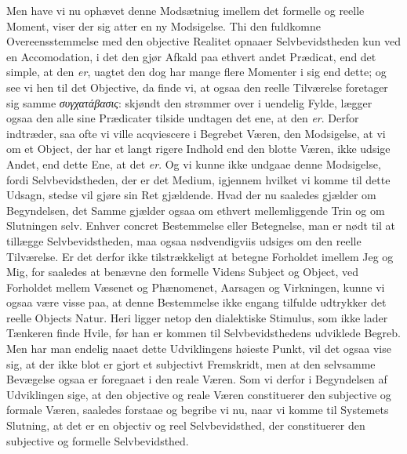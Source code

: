 \documentclass[12pt]{book}
\newcommand{\opage}[1]{\marginnote{\footnotesize\textit{[#1]}}}
\begin{document}
Men have vi nu ophævet denne Modsætniug imellem det formelle og reelle Moment,
viser der sig atter en ny Modsigelse. Thi den fuldkomne Overeensstemmelse med
den objective Realitet opnaaer Selvbevidstheden kun ved en Accomodation, i det
den gjør Afkald paa ethvert andet Prædicat, end det simple, at den \emph{er},
uagtet den dog har mange flere Momenter i sig end dette; og see vi hen til det
Objective, da finde vi, at ogsaa den reelle Tilværelse foretager sig samme
\textit{συγχατάβασις}: skjøndt den strømmer over i uendelig Fylde, lægger ogsaa
den alle sine Prædicater tilside undtagen det ene, at den \emph{er}. Derfor
indtræder, saa ofte vi ville acqviescere i Begrebet Væren, den Modsigelse, at
vi om et Object, der har et langt rigere Indhold end den blotte Væren, ikke
udsige Andet, end dette Ene, at det \emph{er}. Og vi kunne ikke undgaae denne
Modsigelse, fordi Selvbevidstheden, der er det Medium, igjennem hvilket vi
komme til dette Udsagn, stedse vil gjøre sin Ret gjældende. Hvad der nu
saaledes gjælder om Begyndelsen, det Samme gjælder ogsaa om ethvert
mellemliggende Trin og om Slutningen selv. Enhver concret Bestemmelse eller
Betegnelse, man er nødt til at tillægge Selvbevidstheden, maa ogsaa
nødvendigviis udsiges om den reelle Tilværelse. Er det derfor ikke
tilstrækkeligt at betegne Forholdet
\opage{38} imellem Jeg og Mig, for saaledes at benævne den formelle Videns Subject og
Object, ved Forholdet mellem Væsenet og Phænomenet, Aarsagen og Virkningen,
kunne vi ogsaa være visse paa, at denne Bestemmelse ikke engang tilfulde
udtrykker det reelle Objects Natur. Heri ligger netop den dialektiske Stimulus,
som ikke lader Tænkeren finde Hvile, før han er kommen til Selvbevidsthedens
udviklede Begreb. Men har man endelig naaet dette Udviklingens høieste Punkt,
vil det ogsaa vise sig, at der ikke blot er gjort et subjectivt Fremskridt, men
at den selvsamme Bevægelse ogsaa er foregaaet i den reale Væren. Som vi derfor
i Begyndelsen af Udviklingen sige, at den objective og reale Væren constituerer
den subjective og formale Væren, saaledes forstaae og begribe vi nu, naar vi
komme til Systemets Slutning, at det er en objectiv og reel Selvbevidsthed, der
constituerer den subjective og formelle Selvbevidsthed.
\end{document}
